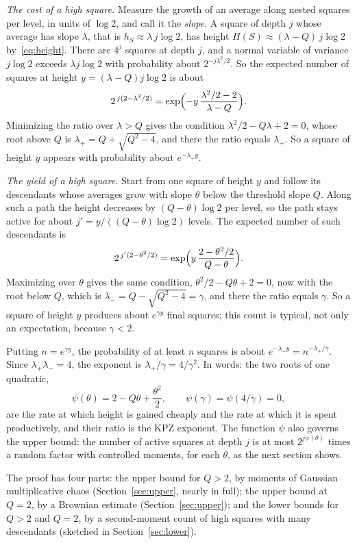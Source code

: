 \emph{The cost of a high square.} Measure the growth of an average along nested squares per level,
in units of $\log2$, and call it the \emph{slope}. A square of depth $j$ whose average has slope
$\lambda$, that is $h_S\approx\lambda\,j\log2$, has height $H(S)\approx(\lambda-Q)\,j\log2$ by~\eqref{eq:height}.
There are $4^j$ squares at depth $j$, and a normal variable of variance $j\log2$ exceeds
$\lambda j\log2$ with probability about $2^{-j\lambda^2/2}$. So the expected number of squares
at height $y=(\lambda-Q)j\log2$ is about
\[
2^{\,j(2-\lambda^2/2)}=\exp\Bigl(-y\,\frac{\lambda^2/2-2}{\lambda-Q}\Bigr).
\]
Minimizing the ratio over $\lambda>Q$ gives the condition $\lambda^2/2-Q\lambda+2=0$, whose root
above $Q$ is $\lambda_+=Q+\sqrt{Q^2-4}$, and there the ratio equals $\lambda_+$. So a square of
height $y$ appears with probability about $e^{-\lambda_+y}$.

\emph{The yield of a high square.} Start from one square of height $y$ and follow its descendants
whose averages grow with slope $\theta$ below the threshold slope $Q$. Along such a path the
height decreases by $(Q-\theta)\log2$ per level, so the path stays active for about
$j'=y/((Q-\theta)\log2)$ levels. The expected number of such descendants is
\[
2^{\,j'(2-\theta^2/2)}=\exp\Bigl(y\,\frac{2-\theta^2/2}{Q-\theta}\Bigr).
\]
Maximizing over $\theta$ gives the same condition, $\theta^2/2-Q\theta+2=0$, now with the root
below $Q$, which is $\lambda_-=Q-\sqrt{Q^2-4}=\gamma$, and there the ratio equals $\gamma$. So a
square of height $y$ produces about $e^{\gamma y}$ final squares; this count is typical, not only an
expectation, because $\gamma<2$.

Putting $n=e^{\gamma y}$, the probability of at least $n$ squares is about
$e^{-\lambda_+y}=n^{-\lambda_+/\gamma}$. Since $\lambda_+\lambda_-=4$, the exponent is
$\lambda_+/\gamma=4/\gamma^2$. In words: the two roots of one quadratic,
\begin{equation}\label{eq:quadratic}
\psi(\theta)=2-Q\theta+\frac{\theta^2}2,\qquad \psi(\gamma)=\psi(4/\gamma)=0,
\end{equation}
are the rate at which height is gained cheaply and the rate at which it is spent productively,
and their ratio is the KPZ exponent. The function $\psi$ also governs the upper bound: the number
of active squares at depth $j$ is at most $2^{j\psi(\theta)}$ times a random factor with controlled
moments, for each $\theta$, as the next section shows.

The proof has four parts: the upper bound for $Q>2$, by moments of Gaussian multiplicative chaos
(Section~\ref{sec:upper}, nearly in full); the upper bound at $Q=2$, by a Brownian estimate
(Section~\ref{sec:upper}); and the lower bounds for $Q>2$ and $Q=2$, by a second-moment count of
high squares with many descendants (sketched in Section~\ref{sec:lower}).
